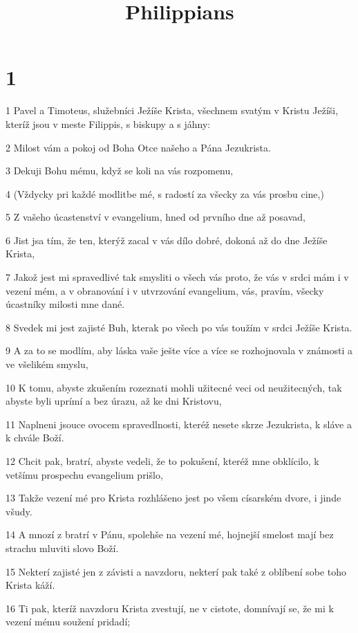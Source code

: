 

\title{Philippians}

\chapter{1}

\par 1 Pavel a Timoteus, služebníci Ježíše Krista, všechnem svatým v Kristu Ježíši, kteríž jsou v meste Filippis, s biskupy a s jáhny:
\par 2 Milost vám a pokoj od Boha Otce našeho a Pána Jezukrista.
\par 3 Dekuji Bohu mému, když se koli na vás rozpomenu,
\par 4 (Vždycky pri každé modlitbe mé, s radostí za všecky za vás prosbu cine,)
\par 5 Z vašeho úcastenství v evangelium, hned od prvního dne až posavad,
\par 6 Jist jsa tím, že ten, kterýž zacal v vás dílo dobré, dokoná až do dne Ježíše Krista,
\par 7 Jakož jest mi spravedlivé tak smysliti o všech vás proto, že vás v srdci mám i v vezení mém, a v obranování i v utvrzování evangelium, vás, pravím, všecky úcastníky milosti mne dané.
\par 8 Svedek mi jest zajisté Buh, kterak po všech po vás toužím v srdci Ježíše Krista.
\par 9 A za to se modlím, aby láska vaše ješte více a více se rozhojnovala v známosti a ve všelikém smyslu,
\par 10 K tomu, abyste zkušením rozeznati mohli užitecné veci od neužitecných, tak abyste byli uprímí a bez úrazu, až ke dni Kristovu,
\par 11 Naplneni jsouce ovocem spravedlnosti, kteréž nesete skrze Jezukrista, k sláve a k chvále Boží.
\par 12 Chcit pak, bratrí, abyste vedeli, že to pokušení, kteréž mne obklícilo, k vetšímu prospechu evangelium prišlo,
\par 13 Takže vezení mé pro Krista rozhlášeno jest po všem císarském dvore, i jinde všudy.
\par 14 A mnozí z bratrí v Pánu, spolehše na vezení mé, hojnejší smelost mají bez strachu mluviti slovo Boží.
\par 15 Nekterí zajisté jen z závisti a navzdoru, nekterí pak také z oblíbení sobe toho Krista káží.
\par 16 Ti pak, kteríž navzdoru Krista zvestují, ne v cistote, domnívají se, že mi k vezení mému soužení pridadí;
